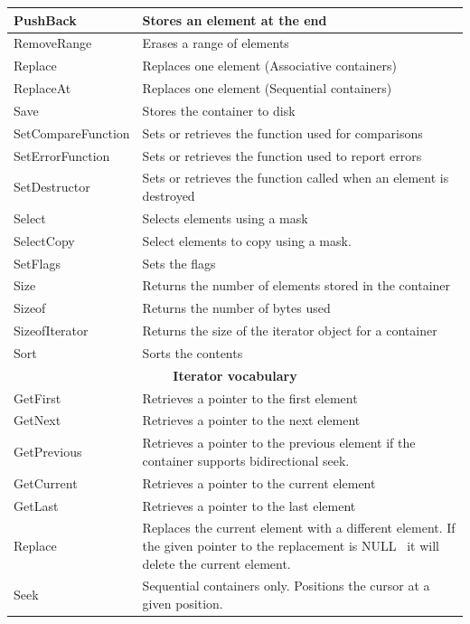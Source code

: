 \documentclass[12pt,a4paper,openany]{memoir} %
\newif\iftth
\newcommand{\Null}{{\iftth \ NULL \else \footnotesize NULL\  \fi}}
\begin{document}
{\begin{longtable}{|p{3.5cm}|p{10.5cm}|}
PushBack& Stores an element at the end \\\hline
RemoveRange&Erases a range of elements \\\hline
Replace & Replaces one element (Associative containers)\\\hline
ReplaceAt & Replaces one element (Sequential containers) \\\hline
Save&Stores the container to disk \\\hline
SetCompareFunction&Sets or retrieves the function used for comparisons \\\hline
SetErrorFunction&Sets or retrieves the function used to report errors\\\hline
SetDestructor&Sets or retrieves the function called when an element is destroyed \\\hline
Select&Selects elements using a mask \\\hline
SelectCopy&Select elements to copy using a mask.\\\hline
SetFlags&Sets the flags\\\hline
Size&Returns the number of elements stored in the container \\\hline
Sizeof&Returns the number of bytes used \\\hline
SizeofIterator&Returns the size of the iterator object for a container \\\hline
Sort&Sorts the contents \\\hline
 
\multicolumn{2}{|c|}{ \textbf{Iterator vocabulary}} \\\hline
GetFirst & Retrieves a pointer to the first element\\\hline
GetNext & Retrieves a pointer to the next element \\\hline
GetPrevious & Retrieves a pointer to the previous element if the container supports bidirectional seek.\\\hline
GetCurrent& Retrieves a pointer to the current element \\\hline
GetLast & Retrieves a pointer to the last element \\\hline
Replace & Replaces the current element with a different element. If the given pointer to the replacement is \Null 
it will delete the current element.\\\hline
Seek& Sequential containers only. Positions the cursor at a given position.\\\hline
\end{longtable}
} %
\end{document}
